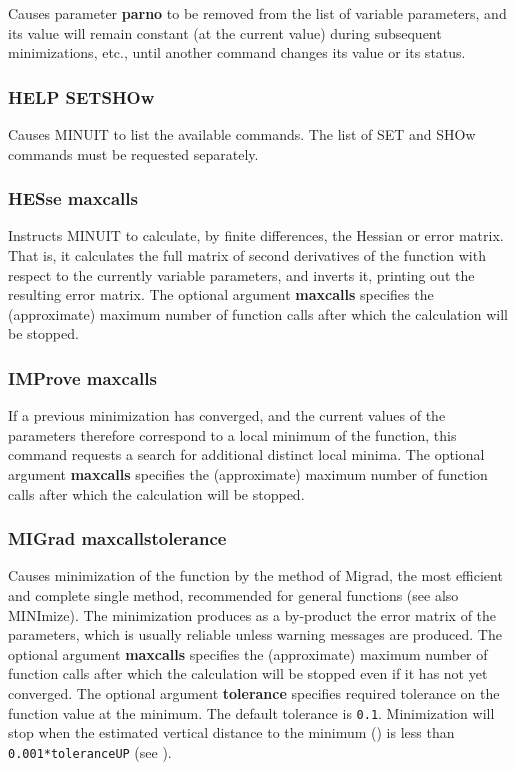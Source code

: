 Causes parameter {\bf parno} to be removed from the list of variable
parameters, and its value will remain constant (at the current value)
during subsequent minimizations, etc., until another command changes
its value or its status.

\subsubsection*{HELP \lsb SET\rsb  \lsb SHOw\rsb }

Causes MINUIT to list the available commands. The list of
SET and SHOw commands must be requested separately.

\subsubsection*{HESse  \lsb maxcalls\rsb }

Instructs MINUIT to calculate, by finite differences, the Hessian or
error matrix. That is, it calculates the full matrix of second
derivatives of the function with respect to the currently variable
parameters, and inverts it, printing out the resulting error matrix.
The optional argument {\bf \lsb maxcalls\rsb } specifies the (approximate) maximum
number of function calls after which the calculation will be stopped.

\subsubsection*{IMProve  \lsb maxcalls\rsb }

If a previous minimization has converged, and the current values
of the parameters therefore correspond to a local minimum of the function,
this command requests a search for additional distinct local minima.
The optional argument {\bf \lsb maxcalls\rsb } specifies the (approximate) maximum
number of function calls after which the calculation will be stopped.

\subsubsection*{MIGrad  \lsb maxcalls\rsb   \lsb tolerance\rsb }

Causes minimization of the function by the method of Migrad, the most
efficient and complete single method, recommended for general functions
(see also MINImize).
The minimization produces as a by-product the error matrix
of the parameters, which is usually reliable unless warning messages
are produced.
The optional argument {\bf \lsb maxcalls\rsb } specifies the (approximate) maximum
number of function calls after which the calculation will be stopped
even if it has not yet converged.
The optional argument {\bf \lsb tolerance\rsb } specifies required tolerance on the
function value at the minimum.  
The default tolerance is \texttt{0.1}.
Minimization will stop when the estimated vertical distance to
the minimum () is less than {\tt 0.001*\lsb tolerance\rsb *UP} 
(see ).


